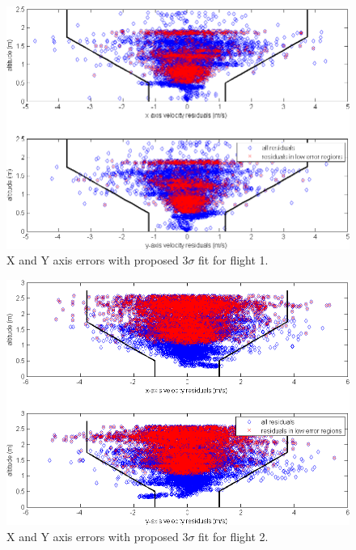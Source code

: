 \documentclass{article}
\begin{document}
\begin{figure}[p]
\centering
\includegraphics[height=0.4\textheight]{../flow figures/resids_v_alt1_w_3sigma.png}
\caption{X and Y axis errors with proposed $3\sigma$ fit for flight 1.}
\label{fig:resids_v_alt1}
\end{figure}
\begin{figure}[p]
\centering
\includegraphics[height=0.4\textheight]{../flow figures/resids_v_alt2_w_3sigma.png}
\caption{X and Y axis errors with proposed $3\sigma$ fit for flight 2.}
\label{fig:resids_v_alt2}
\end{figure}
\end{document}
